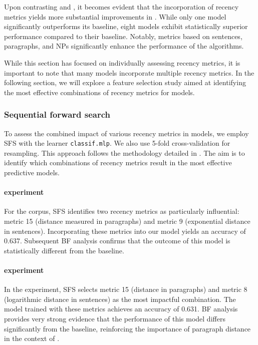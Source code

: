 Upon contrasting \msrcor and \wsj, it becomes evident that the incorporation of recency metrics yields more substantial improvements in \wsj. While only one \msrcor model significantly outperforms its baseline, eight \wsj models exhibit statistically superior performance compared to their baseline. Notably, metrics based on sentences, paragraphs, and NPs significantly enhance the performance of the \wsj algorithms.


While this section has focused on individually assessing recency metrics, it is important to note that many \context models incorporate multiple recency metrics. In the following section, we will explore a feature selection study aimed at identifying the most effective combinations of recency metrics for \context models.

\subsubsection{Sequential forward search}\label{subsec:ffsrecency}

To assess the combined impact of various recency metrics in \context models, we employ SFS with the learner \texttt{classif.mlp}. We also use 5-fold cross-validation for resampling. This approach follows the methodology detailed in . The aim is to identify which combinations of recency metrics result in the most effective predictive models.

\paragraph*{\msrcor experiment}
For the \msrcor corpus, SFS identifies two recency metrics as particularly influential: metric 15 (distance measured in paragraphs) and metric 9 (exponential distance in sentences). Incorporating these metrics into our model yields an accuracy of 0.637. Subsequent BF analysis confirms that the outcome of this model is statistically different from the baseline. 

\paragraph*{\wsj experiment}
In the \wsj experiment, SFS selects metric 15 (distance in paragraphs) and metric 8 (logarithmic distance in sentences) as the most impactful combination. The model trained with these metrics achieves an accuracy of 0.631. BF analysis provides very strong evidence that the performance of this model differs significantly from the baseline, reinforcing the importance of paragraph distance in the context of \wsj.

